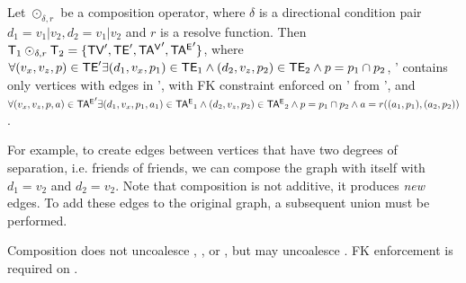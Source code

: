 \begin{definition}[Composition]
Let $\odot_{\delta,r}$ be a composition operator, where $\delta$ is a
directional condition pair $d_1=v_1|v_2, d_2=v_1|v_2$ and $r$ is a
resolve function.  Then $\mathsf{T}_1 \odot_{\delta,r} \mathsf{T}_2 = \{ \textsf{TV}',
\textsf{TE}', \mathsf{TA^{V}}', \mathsf{TA^{E}}' \}$, where $\forall (v_x,v_z,p) \in \textsf{TE}' \exists
(d_1,v_x,p_1) \in \textsf{TE}_1 \wedge (d_2,v_z,p_2) \in \textsf{TE}_2 \wedge p=p_1
\cap p_2$, \tv' contains only vertices with edges in \te', with FK
constraint enforced on \tav' from \tv', and $\forall (v_x,v_z,p,a) \in
\mathsf{TA^{E}}' \exists (d_1,v_x,p_1,a_1) \in \mathsf{TA^{E}}_1 \wedge (d_2,v_z,p_2) \in
\mathsf{TA^{E}}_2 \wedge p=p_1 \cap p_2 \wedge a=r((a_1,p_1),(a_2,p_2))$.
\label{def:composition}
\end{definition}

For example, to create edges between vertices that have two degrees of
separation, i.e. friends of friends, we can compose the graph with
itself with $d_1=v_2$ and $d_2=v_2$.  Note that composition is not
additive, it produces {\em new} edges.  To add these edges to the
original graph, a subsequent union must be performed.  

Composition does not uncoalesce \tv, \te, or \tav, but may uncoalesce
\tae.  FK enforcement is required on \tav.





